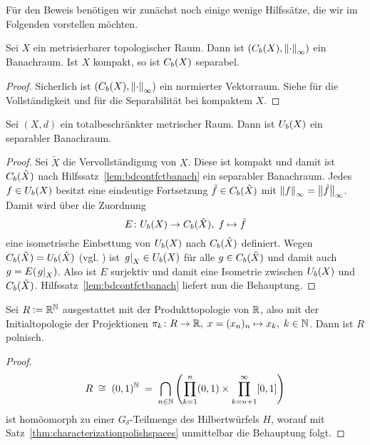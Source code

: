 \documentclass[../main/main.tex]{subfiles}
\begin{document}
	Für den Beweis benötigen wir zunächst noch einige wenige Hilfssätze, die wir im Folgenden vorstellen möchten.
	
	\begin{Hilfssatz}
		\label{lem:bdcontfctbanach}
		Sei $X$ ein metrisierbarer topologischer Raum. Dann ist $(C_b(X), \left\lVert\cdot\right\rVert_\infty)$ ein Banachraum. Ist $X$ kompakt, so ist $C_b(X)$ separabel.
	\end{Hilfssatz}

	\begin{proof}
		Sicherlich ist $(C_b(X), \left\lVert\cdot\right\rVert_\infty)$ ein normierter Vektorraum. Siehe \cite[Satz 2.1.6]{Simon.2015} für die Vollständigkeit und
		\cite[Satz 2.3.7]{Simon.2015} für die Separabilität bei kompaktem $X$.
	\end{proof}
	
	\begin{Hilfssatz}
		\label{lem:bduniffctbanach}
		Sei $(X, d)$ ein totalbeschränkter metrischer Raum. Dann ist $U_b(X)$ ein separabler Banachraum.
	\end{Hilfssatz}
	
	\begin{proof}
		Sei $\tilde{X}$ die Vervollständigung von $X$. Diese ist kompakt und damit ist $C_b(\tilde{X})$ nach Hilfssatz~\ref{lem:bdcontfctbanach} ein separabler Banachraum.
		Jedes $f \in U_b(X)$ besitzt eine eindeutige Fortsetzung $\tilde{f} \in C_b(\tilde{X})$ mit $\left\lVert f\right\rVert_\infty = \left\lVert\tilde{f}\right\rVert_\infty$. Damit wird über die Zuordnung
		\[ E \colon U_b(X) \to C_b(\tilde{X}), \; f \mapsto \tilde{f}  \]
		eine isometrische Einbettung von $U_b(X)$ nach $C_b(\tilde{X})$ definiert. 
		Wegen $C_b(\tilde{X}) = U_b(\tilde{X})$ (vgl. \cite[Satz 2.3.10]{Simon.2015}) ist $\left.g\right|_{X} \in U_b(X)$ für alle $g \in C_b(\tilde{X})$ und damit
		auch $g = E(\left.g\right|_{X})$. Also ist $E$ surjektiv und damit eine Isometrie zwischen $U_b(X)$ und $C_b(\tilde{X})$. Hilfssatz~\ref{lem:bdcontfctbanach} liefert nun die Behauptung.
	\end{proof}
	
	\begin{Hilfssatz}
		\label{lem:R}
		Sei $R \vcentcolon = \mathbb{R}^{\mathbb{N}}$ ausgestattet mit der Produkttopologie von $\mathbb{R}$, also mit der Initialtopologie der Projektionen $\pi_k \colon R \to \mathbb{R}, \; x = (x_n)_n \mapsto x_k , \; k \in \mathbb{N}$. Dann ist $R$ 
		polnisch.
	\end{Hilfssatz}
	
	\begin{proof}
		\[R \; \cong \; (0, 1)^{\mathbb{N}} \; = \; \bigcap_{n \in \mathbb{N}}  \left( \prod_{k=1}^{n} (0, 1) \times \prod_{k=n+1}^{\infty} [0,1] \right) \]
		ist homöomorph zu einer $G_\delta$-Teilmenge des Hilbertwürfels $H$, worauf mit Satz~\ref{thm:characterizationpolishspaces} unmittelbar die Behauptung folgt.
	\end{proof}
\end{document}

